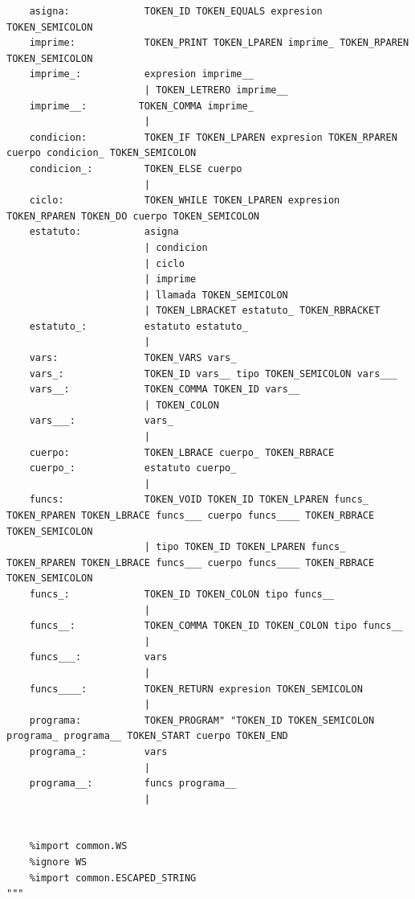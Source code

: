 \documentclass[12pt, letterpaper]{article}
\theoremstyle{definition}
\begin{document}
\begin{verbatim}
    asigna:             TOKEN_ID TOKEN_EQUALS expresion TOKEN_SEMICOLON
    imprime:            TOKEN_PRINT TOKEN_LPAREN imprime_ TOKEN_RPAREN TOKEN_SEMICOLON
    imprime_:           expresion imprime__
                        | TOKEN_LETRERO imprime__
    imprime__:         TOKEN_COMMA imprime_
                        | 
    condicion:          TOKEN_IF TOKEN_LPAREN expresion TOKEN_RPAREN cuerpo condicion_ TOKEN_SEMICOLON
    condicion_:         TOKEN_ELSE cuerpo
                        | 
    ciclo:              TOKEN_WHILE TOKEN_LPAREN expresion TOKEN_RPAREN TOKEN_DO cuerpo TOKEN_SEMICOLON
    estatuto:           asigna
                        | condicion
                        | ciclo
                        | imprime
                        | llamada TOKEN_SEMICOLON
                        | TOKEN_LBRACKET estatuto_ TOKEN_RBRACKET
    estatuto_:          estatuto estatuto_
                        | 
    vars:               TOKEN_VARS vars_
    vars_:              TOKEN_ID vars__ tipo TOKEN_SEMICOLON vars___
    vars__:             TOKEN_COMMA TOKEN_ID vars__
                        | TOKEN_COLON
    vars___:            vars_
                        | 
    cuerpo:             TOKEN_LBRACE cuerpo_ TOKEN_RBRACE
    cuerpo_:            estatuto cuerpo_
                        | 
    funcs:              TOKEN_VOID TOKEN_ID TOKEN_LPAREN funcs_ TOKEN_RPAREN TOKEN_LBRACE funcs___ cuerpo funcs____ TOKEN_RBRACE TOKEN_SEMICOLON
                        | tipo TOKEN_ID TOKEN_LPAREN funcs_ TOKEN_RPAREN TOKEN_LBRACE funcs___ cuerpo funcs____ TOKEN_RBRACE TOKEN_SEMICOLON
    funcs_:             TOKEN_ID TOKEN_COLON tipo funcs__
                        | 
    funcs__:            TOKEN_COMMA TOKEN_ID TOKEN_COLON tipo funcs__
                        | 
    funcs___:           vars
                        |   
    funcs____:          TOKEN_RETURN expresion TOKEN_SEMICOLON
                        | 
    programa:           TOKEN_PROGRAM" "TOKEN_ID TOKEN_SEMICOLON programa_ programa__ TOKEN_START cuerpo TOKEN_END
    programa_:          vars 
                        |
    programa__:         funcs programa__
                        |
                        

    %import common.WS
    %ignore WS
    %import common.ESCAPED_STRING
"""
\end{verbatim}
\end{document}
